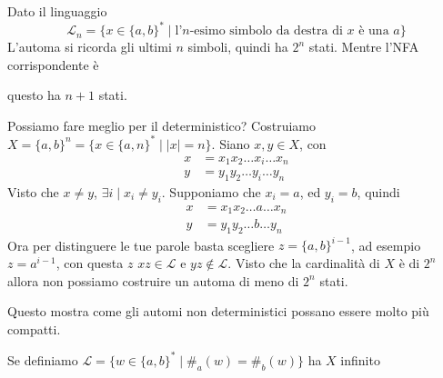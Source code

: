 \documentclass[12pt]{report}
\begin{document}
\begin{tcolorbox}
	Dato il linguaggio 
	$$ \mathcal{L}_n = \{ x \in \{ a, b \}^* \mid \text{l'$n$-esimo simbolo da destra di $x$ è una $a$} \} $$
	L'automa si ricorda gli ultimi $n$ simboli, quindi ha $2^n$ stati.
	Mentre l'NFA corrispondente è 
	\begin{center}
	\end{center}
	questo ha $n + 1$ stati.

	Possiamo fare meglio per il deterministico?
	Costruiamo $X = \{a, b\}^n = \{ x \in \{a, n\}^* \mid |x| = n \} $.
	Siano $x, y \in X$, con 
	\begin{align*}
		x &= x_1 x_2 \dots x_i \dots x_n \\
		y &= y_1 y_2 \dots y_i \dots y_n 
	\end{align*}
	Visto che $x \neq y$, $\exists i \mid x_i \neq y_i$.
	Supponiamo che $x_i = a$, ed $y_i = b$, quindi
	\begin{align*}
		x &= x_1 x_2 \dots a \dots x_n \\
		y &= y_1 y_2 \dots b \dots y_n 
	\end{align*}
	Ora per distinguere le tue parole basta scegliere $z = \{a, b\}^{i - 1}$, ad esempio $z = a^{i - 1}$, con questa $z$ $xz \in \mathcal{L}$ e $yz \not \in \mathcal{L}$.
	Visto che la cardinalità di $X$ è di $2^n$ allora non possiamo costruire un automa di meno di $2^n$ stati.

	Questo mostra come gli automi non deterministici possano essere molto più compatti.
\end{tcolorbox}
\begin{tcolorbox}
	Se definiamo $\mathcal{L} = \{ w \in \{ a, b\}^* \mid \#_a(w) = \#_b(w) \}$ ha $X$ infinito %
\end{tcolorbox}
\end{document}
